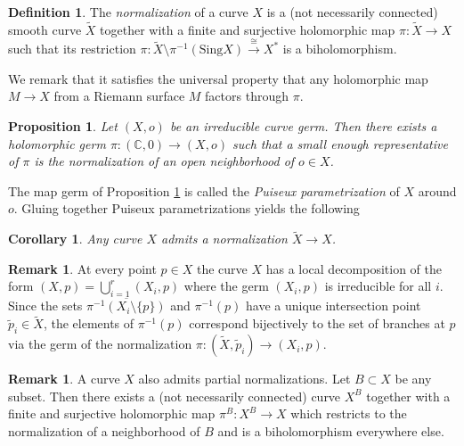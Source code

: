 \documentclass[11pt]{amsart}
\newtheorem{prop}[theorem]{Proposition}
\newtheorem{corollary}[theorem]{Corollary}
\theoremstyle{definition}
\newtheorem{definition}[theorem]{Definition}
\newtheorem{remark}[theorem]{Remark}
\newcommand{\bC}{{\mathbb C}}
\begin{document}
\begin{definition}
    The \emph{normalization} of a curve $X$ is a (not necessarily connected) smooth curve $\widetilde{X}$ together with a finite and surjective holomorphic map $\pi : \widetilde{X}\to X$ such that its restriction $\pi:\widetilde{X} \setminus \pi^{-1}(\text{Sing}X) \xrightarrow{\, \cong\, } X^*$ is a biholomorphism.

    We remark that it satisfies the universal property that any holomorphic map $M \to X$ from a Riemann surface $M$ factors through $\pi$.
\end{definition}

\begin{prop}\label{prop:puiseux}
    Let $(X,o)$ be an irreducible curve germ. Then there exists a holomorphic germ $\pi: (\bC,0) \to (X,o)$ such that a small enough representative of $\pi$ is the normalization of an open neighborhood of $o \in X$.
\end{prop}

\noindent The map germ of Proposition \ref{prop:puiseux} is called the \emph{Puiseux parametrization} of $X$ around $o$. Gluing together Puiseux parametrizations yields the following

\begin{corollary}
    Any curve $X$ admits a normalization $\widetilde{X} \to X$.
\end{corollary}

 \begin{remark}\label{rem:branches} At every point $p\in X$ the curve $X$ has a local decomposition of the form $(X,p) = \bigcup_{i=1}^r(X_i,p)$ where the germ $(X_i,p)$ is irreducible for all $i$. Since the sets $\overline{\pi^{-1}(X_i\setminus \{p\})}$ and $\pi^{-1}(p)$ have a unique intersection point $\tilde{p}_i \in \widetilde{X}$, the elements of $\pi^{-1}(p)$ correspond bijectively to the set of branches at $p$ via the germ of the normalization $\pi:(\widetilde{X},\tilde{p}_i) \to (X_i,p)$. \end{remark}

\begin{remark} \label{rem:partialnorm}
    A curve $X$ also admits partial normalizations. Let $B \subset X$ be any subset. Then there exists a (not necessarily connected) curve $X^B$ together with a finite and surjective holomorphic map $\pi^B: X^B \to X$ which restricts to the normalization of a neighborhood of $B$ and is a biholomorphism everywhere else.
\end{remark}
\end{document}
